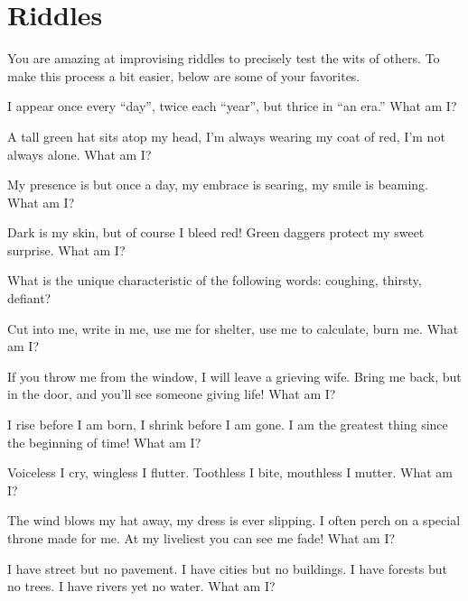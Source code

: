 \documentclass[green]{guildcamp2}
\begin{document}
\name{\gsphinxriddles{}}

\section{Riddles}
You are amazing at improvising riddles to precisely test the wits of others. To make this process a bit easier, below are some of your favorites.

\begin{enum}
	\item I appear once every ``day'', twice each ``year'', but thrice in ``an era.'' What am I?
	
	\item A tall green hat sits atop my head, I'm always wearing my coat of red, I'm not always alone. What am I?
	
	\item My presence is but once a day, my embrace is searing, my smile is beaming. What am I?
	
	\item Dark is my skin, but of course I bleed red! Green daggers protect my sweet surprise. What am I?
	
	\item What is the unique characteristic of the following words: coughing, thirsty, defiant?
	
	\item Cut into me, write in me, use me for shelter, use me to calculate, burn me. What am I?
	
	\item If you throw me from the window, I will leave a grieving wife. Bring me back, but in the door, and you'll see someone giving life! What am I?
	
	\item I rise before I am born, I shrink before I am gone. I am the greatest thing since the beginning of time! What am I?
	
	\item Voiceless I cry, wingless I flutter. Toothless I bite, mouthless I mutter. What am I?
	
	\item The wind blows my hat away, my dress is ever slipping. I often perch on a special throne made for me. At my liveliest you can see me fade! What am I?
	
	\item I have street but no pavement. I have cities but no buildings. I have forests but no trees. I have rivers yet no water. What am I?
	

\end{enum}
\end{document}

